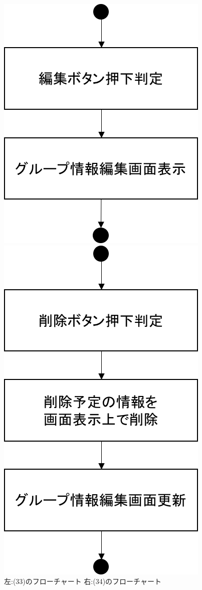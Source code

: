 \begin{figure}[htbp]
 \begin{minipage}{0.5\hsize}
  \begin{center}
   \includegraphics[width=0.6\linewidth,clip]{./img/flow/33.png}
  \end{center}
 \end{minipage}
 \begin{minipage}{0.5\hsize}
  \begin{center}
   \includegraphics[width=0.6\linewidth,clip]{./img/flow/34.png}
  \end{center}
 \end{minipage}
 \caption{左:(33)のフローチャート 右:(34)のフローチャート}\label{fig:33to34to35}
\end{figure}


